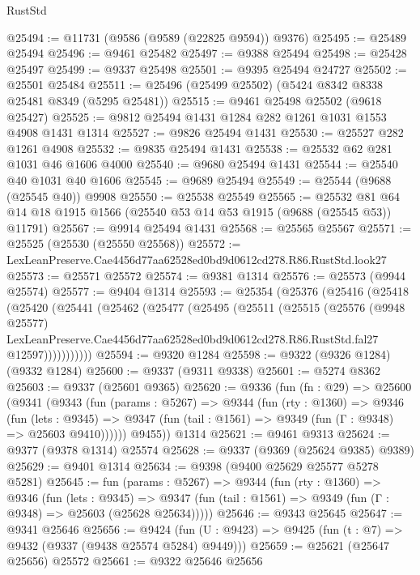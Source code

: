 \begin{lexlean}{RustStd}
\begin{coremodule}
@25494 := @11731 (@9586 (@9589 (@22825 @9594)) @9376)
@25495 := @25489 @25494
@25496 := @9461 @25482
@25497 := @9388 @25494
@25498 := @25428 @25497
@25499 := @9337 @25498
@25501 := @9395 @25494 @24727
@25502 := @25501 @25484
@25511 := @25496 (@25499 @25502) (@5424 @8342 @8338 @25481 @8349 (@5295 @25481))
@25515 := @9461 @25498 @25502 (@9618 @25427)
@25525 := @9812 @25494 @1431 @1284 @282 @1261 @1031 @1553 @4908 @1431 @1314
@25527 := @9826 @25494 @1431
@25530 := @25527 @282 @1261 @4908
@25532 := @9835 @25494 @1431
@25538 := @25532 @62 @281 @1031 @46 @1606 @4000
@25540 := @9680 @25494 @1431
@25544 := @25540 @40 @1031 @40 @1606
@25545 := @9689 @25494
@25549 := @25544 (@9688 (@25545 @40)) @9908
@25550 := @25538 @25549
@25565 := @25532 @81 @64 @14 @18 @1915 @1566 (@25540 @53 @14 @53 @1915 (@9688 (@25545 @53)) @11791)
@25567 := @9914 @25494 @1431
@25568 := @25565 @25567
@25571 := @25525 (@25530 (@25550 @25568))
@25572 := LexLeanPreserve.Cae4456d77aa62528ed0bd9d0612cd278.R86.RustStd.look27
@25573 := @25571 @25572
@25574 := @9381 @1314
@25576 := @25573 (@9944 @25574)
@25577 := @9404 @1314
@25593 := @25354
    (@25376
      (@25416
        (@25418
          (@25420
            (@25441
              (@25462
                (@25477
                  (@25495
                    (@25511
                      (@25515
                        (@25576
                          (@9948 @25577)
                          LexLeanPreserve.Cae4456d77aa62528ed0bd9d0612cd278.R86.RustStd.fal27
                          @12597)))))))))))
@25594 := @9320 @1284
@25598 := @9322 (@9326 @1284) (@9332 @1284)
@25600 := @9337 (@9311 @9338)
@25601 := @5274 @8362
@25603 := @9337 (@25601 @9365)
@25620 := @9336
    (fun (fn : @29) =>
    @25600
      (@9341
        (@9343
          (fun (params : @5267) =>
          @9344
            (fun (rty : @1360) =>
            @9346
              (fun (lets : @9345) =>
              @9347 (fun (tail : @1561) => @9349 (fun (Γ : @9348) => @25603 @9410))))))
        @9455))
    @1314
@25621 := @9461 @9313
@25624 := @9377 (@9378 @1314) @25574
@25628 := @9337 (@9369 (@25624 @9385) @9389)
@25629 := @9401 @1314
@25634 := @9398 (@9400 @25629 @25577 @5278 @5281)
@25645 := fun (params : @5267) =>
  @9344
    (fun (rty : @1360) =>
    @9346
      (fun (lets : @9345) =>
      @9347 (fun (tail : @1561) => @9349 (fun (Γ : @9348) => @25603 (@25628 @25634)))))
@25646 := @9343 @25645
@25647 := @9341 @25646
@25656 := @9424
    (fun (U : @9423) => @9425 (fun (t : @7) => @9432 (@9337 (@9438 @25574 @5284) @9449)))
@25659 := @25621 (@25647 @25656) @25572
@25661 := @9322 @25646 @25656

\end{coremodule}
\end{lexlean}
